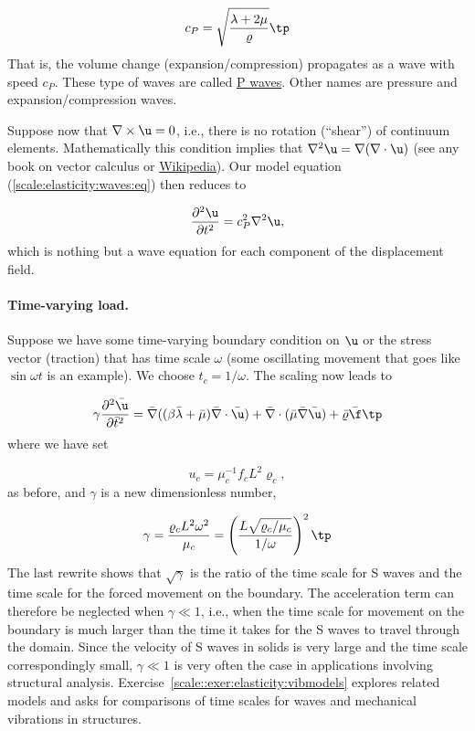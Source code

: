 \documentclass[graybox,envcountchap,sectrefs,final]{svmonodo}
\begin{document}
\[ c_P = \sqrt{\frac{\lambda +2\mu}{\varrho}}\tp\]
That is, the volume change (expansion/compression)
propagates as a wave with speed $c_P$.
These type of waves are called \href{{https://en.wikipedia.org/wiki/P-wave}}{P waves}. Other names are pressure and expansion/compression waves.

Suppose now that $\nabla\times\u =0$, i.e., there is no rotation (``shear'') of
continuum elements. Mathematically this condition implies that
$\nabla^2\u = \nabla(\nabla\cdot\u)$ (see any book on vector calculus
or \href{{https://en.wikipedia.org/wiki/Vector_calculus_identities}}{Wikipedia}).
Our model equation (\ref{scale:elasticity:waves:eq}) then reduces to

\[ \frac{\partial^2\u}{\partial t^2} = c_P^2\nabla^2\u,\]
which is nothing but a wave equation for each component of the
displacement field.


\paragraph{Time-varying load.}
Suppose we have some time-varying boundary condition on $\u$ or the
stress vector (traction) that has time scale $\omega$ (some
oscillating movement that goes like $\sin\omega t$ is an example). We
choose $t_c=1/\omega$.  The scaling now leads to

\[
\gamma
\frac{\partial^2\bar \u}{\partial \bar t^2} =
\bar \nabla ((\beta\bar\lambda +
\bar\mu)\bar \nabla\cdot\bar \u) +
\bar \nabla\cdot(\bar \mu\bar \nabla\bar \u) +
\bar\varrho\bar\f\tp
\]
where we have set

\[ u_c = \mu_c^{-1}f_cL^2\varrho_c,\]
as before, and $\gamma$ is a new dimensionless number,

\[ \gamma = \frac{\varrho_cL^2 \omega^2}{\mu_c} =
\left(\frac{L\sqrt{\varrho_c/\mu_c}}{1/\omega}\right)^2\tp\]
The last rewrite shows that $\sqrt{\gamma}$ is the ratio of
the time scale for S waves and the time scale for the forced
movement on the boundary. The acceleration term can therefore
be neglected when $\gamma\ll 1$, i.e., when the time scale
for movement on the boundary is much larger than the time it
takes for the S waves to travel through the domain.
Since the velocity of S waves in solids is very large and
the time scale correspondingly small, $\gamma\ll 1$
is very often the case in applications involving structural analysis.
Exercise~\ref{scale::exer:elasticity:vibmodels} explores related
models and asks for comparisons of time scales for waves and
mechanical vibrations in structures.
\end{document}
